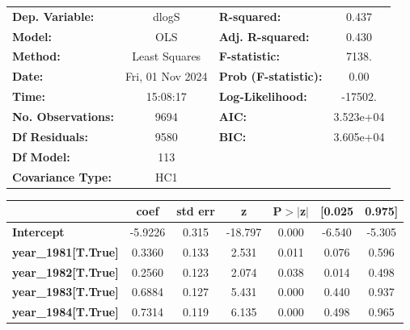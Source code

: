 \begin{center}
\begin{tabular}{lclc}
\toprule
\textbf{Dep. Variable:}           &      dlogS       & \textbf{  R-squared:         } &     0.437   \\
\textbf{Model:}                   &       OLS        & \textbf{  Adj. R-squared:    } &     0.430   \\
\textbf{Method:}                  &  Least Squares   & \textbf{  F-statistic:       } &     7138.   \\
\textbf{Date:}                    & Fri, 01 Nov 2024 & \textbf{  Prob (F-statistic):} &     0.00    \\
\textbf{Time:}                    &     15:08:17     & \textbf{  Log-Likelihood:    } &   -17502.   \\
\textbf{No. Observations:}        &        9694      & \textbf{  AIC:               } & 3.523e+04   \\
\textbf{Df Residuals:}            &        9580      & \textbf{  BIC:               } & 3.605e+04   \\
\textbf{Df Model:}                &         113      & \textbf{                     } &             \\
\textbf{Covariance Type:}         &       HC1        & \textbf{                     } &             \\
\bottomrule
\end{tabular}
\begin{tabular}{lcccccc}
                                  & \textbf{coef} & \textbf{std err} & \textbf{z} & \textbf{P$> |$z$|$} & \textbf{[0.025} & \textbf{0.975]}  \\
\midrule
\textbf{Intercept}                &      -5.9226  &        0.315     &   -18.797  &         0.000        &       -6.540    &       -5.305     \\
\textbf{year\_1981[T.True]}       &       0.3360  &        0.133     &     2.531  &         0.011        &        0.076    &        0.596     \\
\textbf{year\_1982[T.True]}       &       0.2560  &        0.123     &     2.074  &         0.038        &        0.014    &        0.498     \\
\textbf{year\_1983[T.True]}       &       0.6884  &        0.127     &     5.431  &         0.000        &        0.440    &        0.937     \\
\textbf{year\_1984[T.True]}       &       0.7314  &        0.119     &     6.135  &         0.000        &        0.498    &        0.965     \\

\end{tabular}
\end{center}

